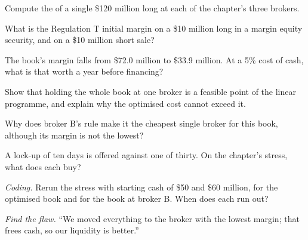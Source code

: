 \begin{exercise}[$\star$]\label{exo:fm:treasury-and-funding:1}
Compute the  of a single \$120 million long at each of the chapter's three brokers.
\end{exercise}

\begin{exercise}[$\star$]\label{exo:fm:treasury-and-funding:2}
What is the Regulation T initial margin on a \$10 million long in a margin equity security, and on a \$10 million short sale?
\end{exercise}

\begin{exercise}[$\star$]\label{exo:fm:treasury-and-funding:3}
The book's margin falls from \$72.0 million to \$33.9 million. At a 5\% cost of cash, what is that worth a year before financing?
\end{exercise}

\begin{exercise}[$\star\star$]\label{exo:fm:treasury-and-funding:4}
Show that holding the whole book at one broker is a feasible point of the linear programme, and explain why the optimised cost cannot exceed it.
\end{exercise}

\begin{exercise}[$\star\star$]\label{exo:fm:treasury-and-funding:5}
Why does broker B's rule make it the cheapest single broker for this book, although its margin is not the lowest?
\end{exercise}

\begin{exercise}[$\star\star$]\label{exo:fm:treasury-and-funding:6}
A lock-up of ten days is offered against one of thirty. On the chapter's stress, what does each buy?
\end{exercise}

\begin{exercise}[$\star\star\star$]\label{exo:fm:treasury-and-funding:7}
\emph{Coding.} Rerun the stress with starting cash of \$50 and \$60 million, for the optimised book and for the book at broker B. When does each
run out?
\end{exercise}

\begin{exercise}[$\star\star\star$]\label{exo:fm:treasury-and-funding:8}
\emph{Find the flaw.} ``We moved everything to the broker with the lowest margin; that frees cash, so our liquidity is better.''
\end{exercise}

